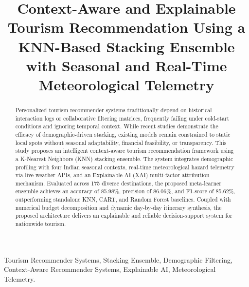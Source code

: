 \documentclass[conference]{IEEEtran}
\begin{document}
\title{Context-Aware and Explainable Tourism Recommendation Using a KNN-Based Stacking Ensemble with Seasonal and Real-Time Meteorological Telemetry}

\author{
}

\maketitle

\begin{abstract}
Personalized tourism recommender systems traditionally depend on historical interaction logs or collaborative filtering matrices, frequently failing under cold-start conditions and ignoring temporal context. While recent studies demonstrate the efficacy of demographic-driven stacking, existing models remain constrained to static local spots without seasonal adaptability, financial feasibility, or transparency. This study proposes an intelligent context-aware tourism recommendation framework using a K-Nearest Neighbors (KNN) stacking ensemble. The system integrates demographic profiling with four Indian seasonal contexts, real-time meteorological hazard telemetry via live weather APIs, and an Explainable AI (XAI) multi-factor attribution mechanism. Evaluated across 175 diverse destinations, the proposed meta-learner ensemble achieves an accuracy of 85.98\%, precision of 86.06\%, and F1-score of 85.62\%, outperforming standalone KNN, CART, and Random Forest baselines. Coupled with numerical budget decomposition and dynamic day-by-day itinerary synthesis, the proposed architecture delivers an explainable and reliable decision-support system for nationwide tourism.
\end{abstract}

\begin{IEEEkeywords}
Tourism Recommender Systems, Stacking Ensemble, Demographic Filtering, Context-Aware Recommender Systems, Explainable AI, Meteorological Telemetry.
\end{IEEEkeywords}
\end{document}
